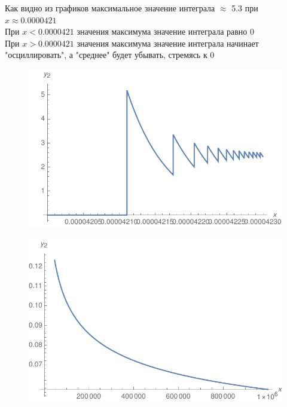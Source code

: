\documentclass[10pt,a4paper]{article}
\begin{document}
Как видно из графиков максимальное значение интеграла $\approx$ 5.3 при $x\approx 0.0000421$\\
При $x<0.0000421$ значения максимума значение интеграла равно 0\\
При $x>0.0000421$ значения максимума значение интеграла начинает "осциллировать", а "среднее" будет убывать, стремясь к 0

\begin{figure}[h]
\includegraphics{gr4}
\end{figure}

\begin{figure}[h]
\includegraphics{gr5}
\end{figure}
\end{document}

